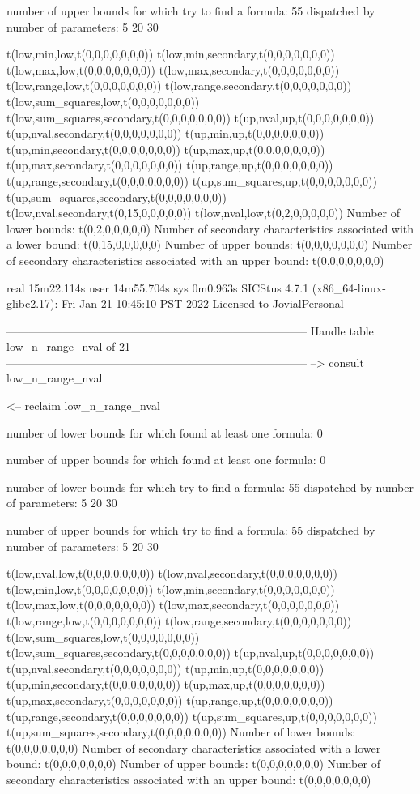 number of upper bounds for which try to find a formula: 55
dispatched by number of parameters: 5  20  30

t(low,min,low,t(0,0,0,0,0,0,0))
t(low,min,secondary,t(0,0,0,0,0,0,0))
t(low,max,low,t(0,0,0,0,0,0,0))
t(low,max,secondary,t(0,0,0,0,0,0,0))
t(low,range,low,t(0,0,0,0,0,0,0))
t(low,range,secondary,t(0,0,0,0,0,0,0))
t(low,sum_squares,low,t(0,0,0,0,0,0,0))
t(low,sum_squares,secondary,t(0,0,0,0,0,0,0))
t(up,nval,up,t(0,0,0,0,0,0,0))
t(up,nval,secondary,t(0,0,0,0,0,0,0))
t(up,min,up,t(0,0,0,0,0,0,0))
t(up,min,secondary,t(0,0,0,0,0,0,0))
t(up,max,up,t(0,0,0,0,0,0,0))
t(up,max,secondary,t(0,0,0,0,0,0,0))
t(up,range,up,t(0,0,0,0,0,0,0))
t(up,range,secondary,t(0,0,0,0,0,0,0))
t(up,sum_squares,up,t(0,0,0,0,0,0,0))
t(up,sum_squares,secondary,t(0,0,0,0,0,0,0))
t(low,nval,secondary,t(0,15,0,0,0,0,0))
t(low,nval,low,t(0,2,0,0,0,0,0))
Number of lower bounds:                                             t(0,2,0,0,0,0,0)
Number of secondary characteristics associated with a lower bound:  t(0,15,0,0,0,0,0)
Number of upper bounds:                                             t(0,0,0,0,0,0,0)
Number of secondary characteristics associated with an upper bound: t(0,0,0,0,0,0,0)

real	15m22.114s
user	14m55.704s
sys	0m0.963s
SICStus 4.7.1 (x86_64-linux-glibc2.17): Fri Jan 21 10:45:10 PST 2022
Licensed to JovialPersonal


--------------------------------------------------------------------------------
Handle table low_n_range_nval of 21
--------------------------------------------------------------------------------
--> consult low_n_range_nval

<-- reclaim low_n_range_nval

number of lower bounds for which found at least one formula: 0

number of upper bounds for which found at least one formula: 0

number of lower bounds for which try to find a formula: 55
dispatched by number of parameters: 5  20  30

number of upper bounds for which try to find a formula: 55
dispatched by number of parameters: 5  20  30

t(low,nval,low,t(0,0,0,0,0,0,0))
t(low,nval,secondary,t(0,0,0,0,0,0,0))
t(low,min,low,t(0,0,0,0,0,0,0))
t(low,min,secondary,t(0,0,0,0,0,0,0))
t(low,max,low,t(0,0,0,0,0,0,0))
t(low,max,secondary,t(0,0,0,0,0,0,0))
t(low,range,low,t(0,0,0,0,0,0,0))
t(low,range,secondary,t(0,0,0,0,0,0,0))
t(low,sum_squares,low,t(0,0,0,0,0,0,0))
t(low,sum_squares,secondary,t(0,0,0,0,0,0,0))
t(up,nval,up,t(0,0,0,0,0,0,0))
t(up,nval,secondary,t(0,0,0,0,0,0,0))
t(up,min,up,t(0,0,0,0,0,0,0))
t(up,min,secondary,t(0,0,0,0,0,0,0))
t(up,max,up,t(0,0,0,0,0,0,0))
t(up,max,secondary,t(0,0,0,0,0,0,0))
t(up,range,up,t(0,0,0,0,0,0,0))
t(up,range,secondary,t(0,0,0,0,0,0,0))
t(up,sum_squares,up,t(0,0,0,0,0,0,0))
t(up,sum_squares,secondary,t(0,0,0,0,0,0,0))
Number of lower bounds:                                             t(0,0,0,0,0,0,0)
Number of secondary characteristics associated with a lower bound:  t(0,0,0,0,0,0,0)
Number of upper bounds:                                             t(0,0,0,0,0,0,0)
Number of secondary characteristics associated with an upper bound: t(0,0,0,0,0,0,0)

